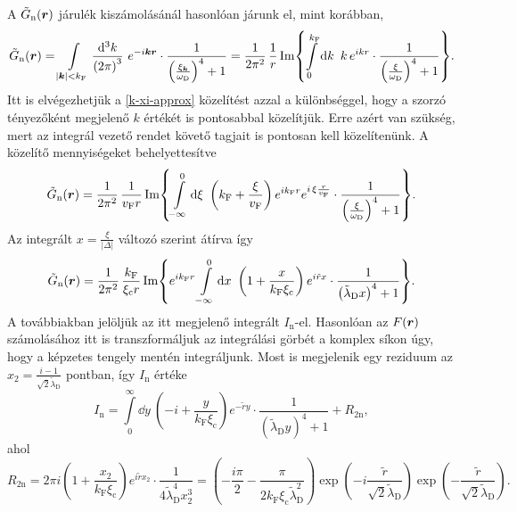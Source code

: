 \documentclass[a4paper,12pt,titlepage]{article}
\newcommand{\KK}{{\vb*{k}}}
\newcommand{\RR}{{\vb*{r}}}
\newcommand{\kF}{{k_\text{F}}}
\newcommand{\vF}{{v_\text{F}}}
\newcommand{\xic}{{\xi_\text{c}}}
\begin{document}
A $\tilde{G}_\text{n}(\RR)$ járulék kiszámolásánál hasonlóan járunk el, mint korábban,
\begin{equation}
	\tilde{G}_\text{n}(\RR) = \int\limits_{\left| \KK \right| < \kF} \frac{\dd[3]{k}}{\left( 2 \pi \right)^3} ~ e^{-i \KK \RR} \cdot \frac{1}{\left( \frac{\xi_\KK}{\omega_\text{D}} \right)^4 + 1} = \frac{1}{2 \pi^2} \, \frac{1}{r} \Im{ \int\limits_0^{\kF} \dd{k} ~ k \, e^{i k r} \cdot \frac{1}{\left( \frac{\xi}{\omega_\text{D}} \right)^4 + 1} }.
\end{equation}
Itt is elvégezhetjük a \eqref{k-xi-approx} közelítést azzal a különbséggel, hogy a szorzó tényezőként megjelenő $k$ értékét is pontosabbal közelítjük.  Erre azért van szükség, mert az integrál vezető rendet követő tagjait is pontosan kell közelítenünk.  A közelítő mennyiségeket behelyettesítve
\begin{equation}
	\tilde{G}_\text{n}(\RR) = \frac{1}{2 \pi^2} \, \frac{1}{\vF r} \Im{ \int\limits_{-\infty}^0 \dd{\xi} ~ \left( \kF + \frac{\xi}{\vF} \right) e^{i \kF r} e^{i \, \xi \frac{r}{\vF}} \cdot \frac{1}{\left( \frac{\xi}{\omega_\text{D}} \right)^4 + 1} }.
\end{equation}
Az integrált $x = \frac{\xi}{\left| \Delta \right|}$ változó szerint átírva így
\begin{equation}
	\tilde{G}_\text{n}(\RR) = \frac{1}{2 \pi^2} \, \frac{\kF}{\xic r} \Im{ e^{i \kF r} \int\limits_{-\infty}^0 \dd{x} ~ \left( 1 + \frac{x}{\kF \xic} \right) e^{i \tilde{r} x} \cdot \frac{1}{\left( \tilde{\lambda}_\text{D} x \right)^4 + 1} }.
\end{equation}
A továbbiakban jelöljük az itt megjelenő integrált $I_\text{n}$-el.  Hasonlóan az $F(\RR)$ számolásához itt is transzformáljuk az integrálási görbét a komplex síkon úgy, hogy a képzetes tengely mentén integráljunk.  Most is megjelenik egy reziduum az $x_2 = \frac{i - 1}{\sqrt{2} \tilde{\lambda}_\text{D}}$ pontban, így $I_\text{n}$ értéke
\begin{equation}
	I_\text{n} = \int\limits_0^\infty \dd{y} ~ \left( -i + \frac{y}{\kF \xic} \right) e^{-\tilde{r} y} \cdot \frac{1}{\left( \tilde{\lambda}_\text{D} y \right)^4 + 1} + R_{2 \text{n}},
\end{equation}
ahol
\begin{equation}
	R_{2 \text{n}} = 2 \pi i \left( 1 + \frac{x_2}{\kF \xic} \right) e^{i \tilde{r} x_2} \cdot \frac{1}{4 \tilde{\lambda}_\text{D}^4 x_2^3} = \left( -\frac{i \pi}{2} - \frac{\pi}{2 \kF \xic \tilde{\lambda}_\text{D}^2} \right) \exp(-i \frac{\tilde{r}}{\sqrt{2} \tilde{\lambda}_\text{D}}) \exp(-\frac{\tilde{r}}{\sqrt{2} \tilde{\lambda}_\text{D}}).
\end{equation}
\end{document}
